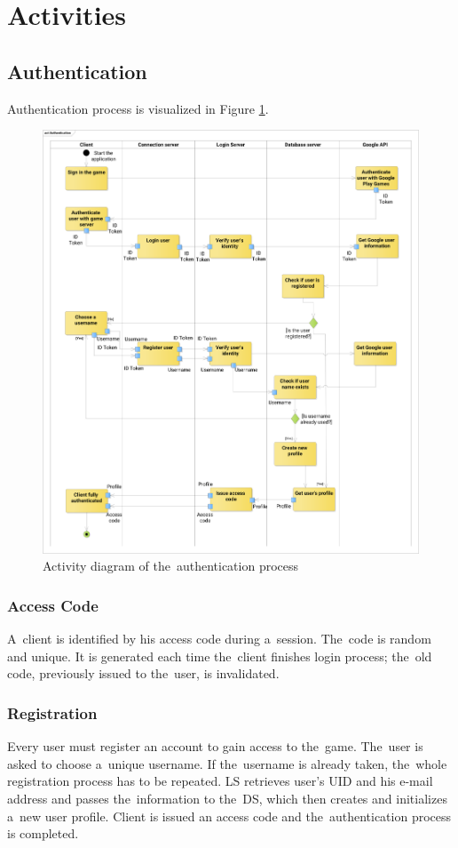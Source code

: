\section{Activities}
	\subsection{Authentication}
	Authentication process is visualized in Figure \ref{fig:adauth}.
	
	\begin{figure}[h]	
		\includegraphics[width=\textwidth]{figures/AD_Authentication2}
		\centering			
		\caption{Activity diagram of the~authentication process}
		\label{fig:adauth}
	\end{figure}

		\subsubsection*{Access Code}
		A~client is identified by his access code during a~session. The~code is random and unique. It is generated each time the~client finishes login process; the~old code,  previously issued to the~user, is invalidated.
		
		\subsubsection*{Registration}
		Every user must register an account to gain access to the~game. The~user is asked to choose a~unique username. If the~username is already taken, the~whole registration process has to be repeated. LS retrieves user's UID and his e-mail address and passes the~information to the~DS, which then creates and initializes a~new user profile. Client is issued an access code and the~authentication process is completed.
		
